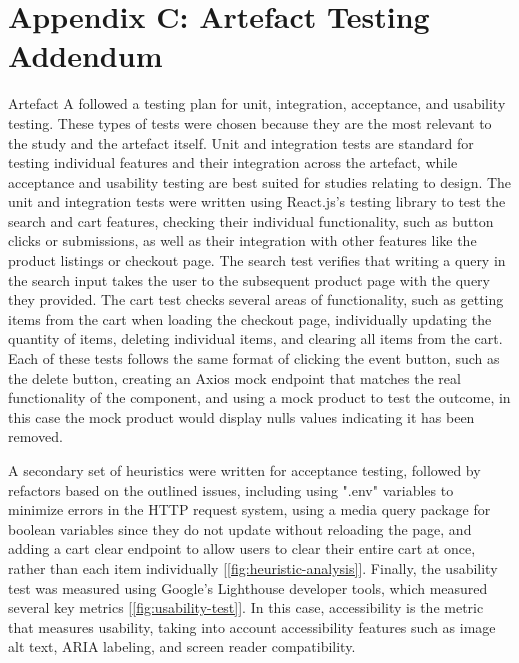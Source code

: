 \documentclass[article]{IEEEtran}
\begin{document}
        \section*{Appendix C: Artefact Testing Addendum}
            Artefact A followed a testing plan for unit, integration, acceptance, and usability testing. These types of tests were chosen because they are the most relevant to the study and the artefact itself. Unit and integration tests are standard for testing individual features and their integration across the artefact, while acceptance and usability testing are best suited for studies relating to design. The unit and integration tests were written using React.js's testing library to test the search and cart features, checking their individual functionality, such as button clicks or submissions, as well as their integration with other features like the product listings or checkout page. The search test verifies that writing a query in the search input takes the user to the subsequent product page with the query they provided. The cart test checks several areas of functionality, such as getting items from the cart when loading the checkout page, individually updating the quantity of items, deleting individual items, and clearing all items from the cart. Each of these tests follows the same format of clicking the event button, such as the delete button, creating an Axios mock endpoint that matches the real functionality of the component, and using a mock product to test the outcome, in this case the mock product would display nulls values indicating it has been removed. 
            
            A secondary set of heuristics were written for acceptance testing, followed by refactors based on the outlined issues, including using ".env" variables to minimize errors in the HTTP request system, using a media query package for boolean variables since they do not update without reloading the page, and adding a cart clear endpoint to allow users to clear their entire cart at once, rather than each item individually [\autoref{fig:heuristic-analysis}]. Finally, the usability test was measured using Google's Lighthouse developer tools, which measured several key metrics [\autoref{fig:usability-test}]. In this case, accessibility is the metric that measures usability, taking into account accessibility features such as image alt text, ARIA labeling, and screen reader compatibility.
\end{document}
